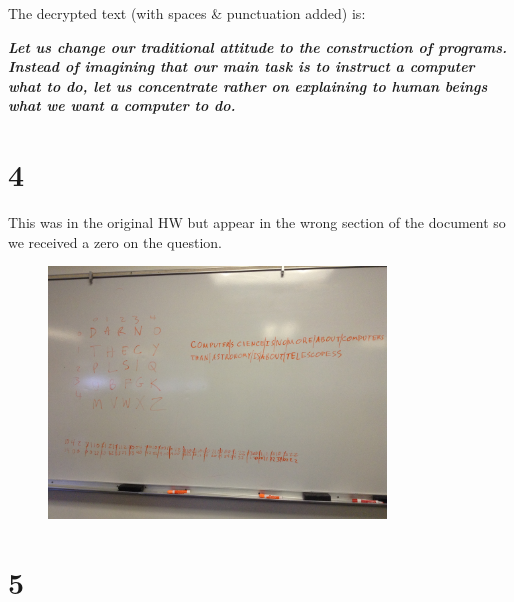 \documentclass[a4paper]{article}
\begin{document}
The decrypted text (with spaces \& punctuation added) is:

\textbf{\textit{Let us change our traditional attitude to the construction of programs. Instead of imagining that our main task is to instruct a computer what to do, let us concentrate rather on explaining to human beings what we want a computer to do.}}

\section*{4}
This was in the original HW but appear in the wrong section of the document so we received a zero on the question.
\begin{figure}[H]
\centering
\includegraphics[width=0.8\textwidth]{prob4.jpg}
\end{figure}

\section*{5}
\end{document}
